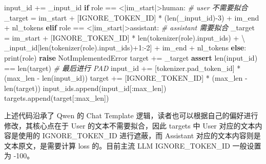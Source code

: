 \documentclass[
]{article}
\newenvironment{Shaded}{}{}
\newcommand{\BuiltInTok}[1]{\textcolor[rgb]{0.00,0.50,0.00}{#1}}
\newcommand{\CommentTok}[1]{\textcolor[rgb]{0.38,0.63,0.69}{\textit{#1}}}
\newcommand{\ControlFlowTok}[1]{\textcolor[rgb]{0.00,0.44,0.13}{\textbf{#1}}}
\newcommand{\DecValTok}[1]{\textcolor[rgb]{0.25,0.63,0.44}{#1}}
\newcommand{\NormalTok}[1]{#1}
\newcommand{\OperatorTok}[1]{\textcolor[rgb]{0.40,0.40,0.40}{#1}}
\newcommand{\PreprocessorTok}[1]{\textcolor[rgb]{0.74,0.48,0.00}{#1}}
\newcommand{\StringTok}[1]{\textcolor[rgb]{0.25,0.44,0.63}{#1}}
\begin{document}
\begin{Shaded}
\begin{Highlighting}[]
\NormalTok{        input\_id }\OperatorTok{+=}\NormalTok{ \_input\_id}
        \ControlFlowTok{if}\NormalTok{ role }\OperatorTok{==} \StringTok{\textquotesingle{}\textless{}|im\_start|\textgreater{}human\textquotesingle{}}\NormalTok{:}
            \CommentTok{\# user 不需要拟合}
\NormalTok{            \_target }\OperatorTok{=}\NormalTok{ im\_start }\OperatorTok{+}\NormalTok{ [IGNORE\_TOKEN\_ID] }\OperatorTok{*}\NormalTok{ (}\BuiltInTok{len}\NormalTok{(\_input\_id)}\OperatorTok{{-}}\DecValTok{3}\NormalTok{) }\OperatorTok{+}\NormalTok{ im\_end }\OperatorTok{+}\NormalTok{ nl\_tokens}
        \ControlFlowTok{elif}\NormalTok{ role }\OperatorTok{==} \StringTok{\textquotesingle{}\textless{}|im\_start|\textgreater{}assistant\textquotesingle{}}\NormalTok{:}
            \CommentTok{\# assistant 需要拟合}
\NormalTok{            \_target }\OperatorTok{=}\NormalTok{ im\_start }\OperatorTok{+}\NormalTok{ [IGNORE\_TOKEN\_ID] }\OperatorTok{*} \BuiltInTok{len}\NormalTok{(tokenizer(role).input\_ids) }\OperatorTok{+} \OperatorTok{\textbackslash{}}
\NormalTok{                \_input\_id[}\BuiltInTok{len}\NormalTok{(tokenizer(role).input\_ids)}\OperatorTok{+}\DecValTok{1}\NormalTok{:}\OperatorTok{{-}}\DecValTok{2}\NormalTok{] }\OperatorTok{+}\NormalTok{ im\_end }\OperatorTok{+}\NormalTok{ nl\_tokens}
        \ControlFlowTok{else}\NormalTok{:}
            \BuiltInTok{print}\NormalTok{(role)}
            \ControlFlowTok{raise} \PreprocessorTok{NotImplementedError}
\NormalTok{        target }\OperatorTok{+=}\NormalTok{ \_target}
    \ControlFlowTok{assert} \BuiltInTok{len}\NormalTok{(input\_id) }\OperatorTok{==} \BuiltInTok{len}\NormalTok{(target)}
    \CommentTok{\# 最后进行 PAD}
\NormalTok{    input\_id }\OperatorTok{+=}\NormalTok{ [tokenizer.pad\_token\_id] }\OperatorTok{*}\NormalTok{ (max\_len }\OperatorTok{{-}} \BuiltInTok{len}\NormalTok{(input\_id))}
\NormalTok{    target }\OperatorTok{+=}\NormalTok{ [IGNORE\_TOKEN\_ID] }\OperatorTok{*}\NormalTok{ (max\_len }\OperatorTok{{-}} \BuiltInTok{len}\NormalTok{(target))}
\NormalTok{    input\_ids.append(input\_id[:max\_len])}
\NormalTok{    targets.append(target[:max\_len])}
\end{Highlighting}
\end{Shaded}

上述代码沿承了 Qwen 的 Chat Template
逻辑，读者也可以根据自己的偏好进行修改，其核心点在于 User
的文本不需要拟合，因此 targets 中 User 对应的文本内容是使用的
IGNORE\_TOKEN\_ID 进行遮蔽，而 Assistant
对应的文本内容则是文本原文，是需要计算 loss 的。目前主流 LLM
IGNORE\_TOKEN\_ID 一般设置为 -100。
\end{document}
